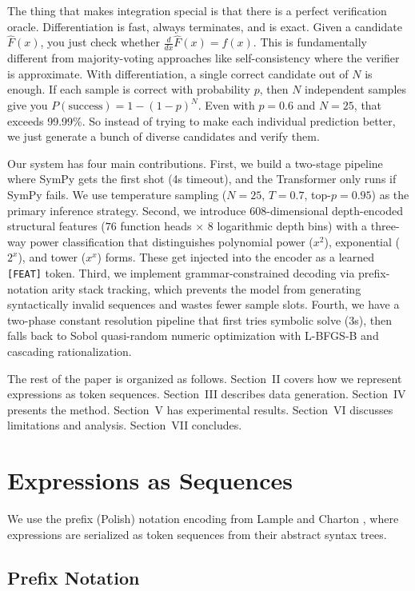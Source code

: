 \documentclass[conference]{IEEEtran}
\begin{document}
The thing that makes integration special is that there is a perfect verification oracle. Differentiation is fast, always terminates, and is exact. Given a candidate $\hat{F}(x)$, you just check whether $\frac{d}{dx}\hat{F}(x) = f(x)$. This is fundamentally different from majority-voting approaches like self-consistency \cite{b33} where the verifier is approximate. With differentiation, a single correct candidate out of $N$ is enough. If each sample is correct with probability $p$, then $N$ independent samples give you $P(\text{success}) = 1 - (1 - p)^N$. Even with $p = 0.6$ and $N = 25$, that exceeds 99.99\%. So instead of trying to make each individual prediction better, we just generate a bunch of diverse candidates and verify them.

Our system has four main contributions. First, we build a two-stage pipeline where SymPy gets the first shot (4s timeout), and the Transformer only runs if SymPy fails. We use temperature sampling ($N = 25$, $T = 0.7$, top-$p = 0.95$) as the primary inference strategy. Second, we introduce 608-dimensional depth-encoded structural features ($76$ function heads $\times$ 8 logarithmic depth bins) with a three-way power classification that distinguishes polynomial power ($x^2$), exponential ($2^x$), and tower ($x^x$) forms. These get injected into the encoder as a learned \texttt{[FEAT]} token. Third, we implement grammar-constrained decoding via prefix-notation arity stack tracking, which prevents the model from generating syntactically invalid sequences and wastes fewer sample slots. Fourth, we have a two-phase constant resolution pipeline that first tries symbolic solve (3s), then falls back to Sobol quasi-random numeric optimization with L-BFGS-B and cascading rationalization.

The rest of the paper is organized as follows. Section~II covers how we represent expressions as token sequences. Section~III describes data generation. Section~IV presents the method. Section~V has experimental results. Section~VI discusses limitations and analysis. Section~VII concludes.

\section{Expressions as Sequences}

We use the prefix (Polish) notation encoding from Lample and Charton \cite{b19}, where expressions are serialized as token sequences from their abstract syntax trees.

\subsection{Prefix Notation}
\end{document}
